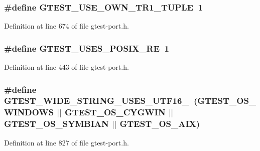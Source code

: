 \subsubsection[{\texorpdfstring{G\+T\+E\+S\+T\+\_\+\+U\+S\+E\+\_\+\+O\+W\+N\+\_\+\+T\+R1\+\_\+\+T\+U\+P\+LE}{GTEST_USE_OWN_TR1_TUPLE}}]{\setlength{\rightskip}{0pt plus 5cm}\#define G\+T\+E\+S\+T\+\_\+\+U\+S\+E\+\_\+\+O\+W\+N\+\_\+\+T\+R1\+\_\+\+T\+U\+P\+LE~1}\hypertarget{gtest-port_8h_afa144e5f5d039db0df873e7ad48c1fda}{}\label{gtest-port_8h_afa144e5f5d039db0df873e7ad48c1fda}


Definition at line 674 of file gtest-\/port.\+h.

\subsubsection[{\texorpdfstring{G\+T\+E\+S\+T\+\_\+\+U\+S\+E\+S\+\_\+\+P\+O\+S\+I\+X\+\_\+\+RE}{GTEST_USES_POSIX_RE}}]{\setlength{\rightskip}{0pt plus 5cm}\#define G\+T\+E\+S\+T\+\_\+\+U\+S\+E\+S\+\_\+\+P\+O\+S\+I\+X\+\_\+\+RE~1}\hypertarget{gtest-port_8h_acecef794eeb09598cd47da764271cb18}{}\label{gtest-port_8h_acecef794eeb09598cd47da764271cb18}


Definition at line 443 of file gtest-\/port.\+h.

\subsubsection[{\texorpdfstring{G\+T\+E\+S\+T\+\_\+\+W\+I\+D\+E\+\_\+\+S\+T\+R\+I\+N\+G\+\_\+\+U\+S\+E\+S\+\_\+\+U\+T\+F16\+\_\+}{GTEST_WIDE_STRING_USES_UTF16_}}]{\setlength{\rightskip}{0pt plus 5cm}\#define G\+T\+E\+S\+T\+\_\+\+W\+I\+D\+E\+\_\+\+S\+T\+R\+I\+N\+G\+\_\+\+U\+S\+E\+S\+\_\+\+U\+T\+F16\+\_\+~(G\+T\+E\+S\+T\+\_\+\+O\+S\+\_\+\+W\+I\+N\+D\+O\+WS $\vert$$\vert$ G\+T\+E\+S\+T\+\_\+\+O\+S\+\_\+\+C\+Y\+G\+W\+IN $\vert$$\vert$ G\+T\+E\+S\+T\+\_\+\+O\+S\+\_\+\+S\+Y\+M\+B\+I\+AN $\vert$$\vert$ G\+T\+E\+S\+T\+\_\+\+O\+S\+\_\+\+A\+IX)}\hypertarget{gtest-port_8h_a0e3904ca8d62334ab5f29c057dceb6a1}{}\label{gtest-port_8h_a0e3904ca8d62334ab5f29c057dceb6a1}


Definition at line 827 of file gtest-\/port.\+h.

